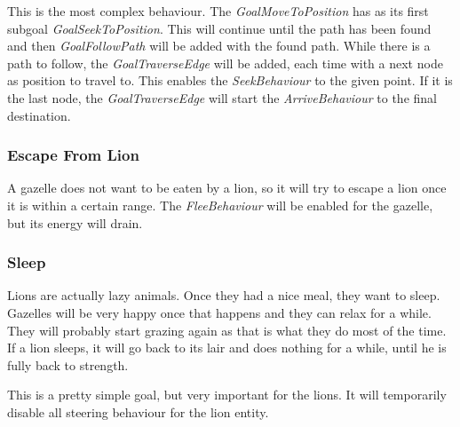 This is the most complex behaviour.
The \textit{GoalMoveToPosition} has as its first subgoal \textit{GoalSeekToPosition}.
This will continue until the path has been found and then \textit{GoalFollowPath} will be added with the found path.
While there is a path to follow, the \textit{GoalTraverseEdge} will be added, each time with a next node as position to travel to.
This enables the \textit{SeekBehaviour} to the given point.
If it is the last node, the \textit{GoalTraverseEdge} will start the \textit{ArriveBehaviour} to the final destination.

\subsubsection{Escape From Lion}\label{sec:behaviourEscape}
A gazelle does not want to be eaten by a lion, so it will try to escape a lion once it is within a certain range.
The \textit{FleeBehaviour} will be enabled for the gazelle, but its energy will drain.

\subsubsection{Sleep}\label{sec:behaviourSleep}
Lions are actually lazy animals.
Once they had a nice meal, they want to sleep.
Gazelles will be very happy once that happens and they can relax for a while.
They will probably start grazing again as that is what they do most of the time.
If a lion sleeps, it will go back to its lair and does nothing for a while, until he is fully back to strength.

This is a pretty simple goal, but very important for the lions.
It will temporarily disable all steering behaviour for the lion entity.

